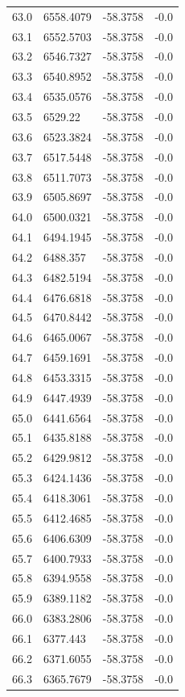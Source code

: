 \begin{table}[H]
\begin{tabular}{llll}
63.0 & 6558.4079 & -58.3758 & -0.0 \\
63.1 & 6552.5703 & -58.3758 & -0.0 \\
63.2 & 6546.7327 & -58.3758 & -0.0 \\
63.3 & 6540.8952 & -58.3758 & -0.0 \\
63.4 & 6535.0576 & -58.3758 & -0.0 \\
63.5 & 6529.22 & -58.3758 & -0.0 \\
63.6 & 6523.3824 & -58.3758 & -0.0 \\
63.7 & 6517.5448 & -58.3758 & -0.0 \\
63.8 & 6511.7073 & -58.3758 & -0.0 \\
63.9 & 6505.8697 & -58.3758 & -0.0 \\
64.0 & 6500.0321 & -58.3758 & -0.0 \\
64.1 & 6494.1945 & -58.3758 & -0.0 \\
64.2 & 6488.357 & -58.3758 & -0.0 \\
64.3 & 6482.5194 & -58.3758 & -0.0 \\
64.4 & 6476.6818 & -58.3758 & -0.0 \\
64.5 & 6470.8442 & -58.3758 & -0.0 \\
64.6 & 6465.0067 & -58.3758 & -0.0 \\
64.7 & 6459.1691 & -58.3758 & -0.0 \\
64.8 & 6453.3315 & -58.3758 & -0.0 \\
64.9 & 6447.4939 & -58.3758 & -0.0 \\
65.0 & 6441.6564 & -58.3758 & -0.0 \\
65.1 & 6435.8188 & -58.3758 & -0.0 \\
65.2 & 6429.9812 & -58.3758 & -0.0 \\
65.3 & 6424.1436 & -58.3758 & -0.0 \\
65.4 & 6418.3061 & -58.3758 & -0.0 \\
65.5 & 6412.4685 & -58.3758 & -0.0 \\
65.6 & 6406.6309 & -58.3758 & -0.0 \\
65.7 & 6400.7933 & -58.3758 & -0.0 \\
65.8 & 6394.9558 & -58.3758 & -0.0 \\
65.9 & 6389.1182 & -58.3758 & -0.0 \\
66.0 & 6383.2806 & -58.3758 & -0.0 \\
66.1 & 6377.443 & -58.3758 & -0.0 \\
66.2 & 6371.6055 & -58.3758 & -0.0 \\
66.3 & 6365.7679 & -58.3758 & -0.0 \\

\end{tabular}
\end{table}
